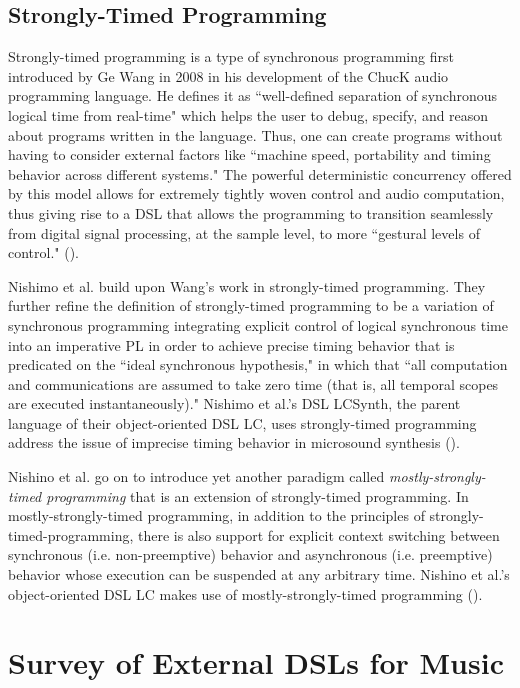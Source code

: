 \documentclass{report}
\newcommand\citeparen[1]{(\cite{#1})}
\begin{document}
\subsection{Strongly-Timed Programming}
\label{sec:strongly_timed}
Strongly-timed programming is a type of synchronous programming first introduced by Ge Wang in 2008 in his development of the ChucK audio programming language. He defines it as ``well-defined separation of synchronous logical time from real-time" which helps the user to debug, specify, and reason about programs  written in the language. Thus, one can create  programs without having to consider external  factors like ``machine speed, portability and timing behavior across different systems." The powerful deterministic  concurrency offered by this  model allows for extremely tightly woven control and audio computation, thus giving rise to a DSL that allows the programming to transition seamlessly from digital signal processing, at the sample level, to more ``gestural levels of control." \citeparen{wang_2008}.

Nishimo et al. build upon Wang's work in strongly-timed programming. They further refine the definition of strongly-timed programming to be a variation of synchronous programming  integrating explicit control of logical synchronous time into an imperative PL in order to achieve precise timing behavior that is predicated on the ``ideal synchronous hypothesis," in which  that ``all computation and communications are assumed to take zero time (that is, all temporal scopes are executed instantaneously)." Nishimo  et al.'s DSL LCSynth, the parent language of  their object-oriented DSL LC, uses strongly-timed programming address the issue of imprecise  timing behavior in microsound synthesis \citeparen{nishino_2012}.

Nishino et al. go on to introduce yet another paradigm called  \textit{mostly-strongly-timed programming} that is an extension of strongly-timed programming. In mostly-strongly-timed programming, in addition to the principles of strongly-timed-programming, there is also support for  explicit  context  switching  between synchronous (i.e. non-preemptive) behavior and asynchronous (i.e. preemptive) behavior whose execution can be suspended at any arbitrary  time. Nishino et al.'s object-oriented DSL LC makes use of mostly-strongly-timed programming \citeparen{nishino_2012}.

\section{Survey of External DSLs for Music}
\label{sec:external}
\end{document}
